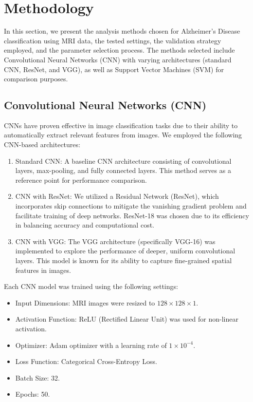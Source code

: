 \documentclass[runningheads]{llncs}
\begin{document}
\section{Methodology}

In this section, we present the analysis methods chosen for Alzheimer's Disease classification using MRI data, the tested settings, the validation strategy employed, and the parameter selection process. The methods selected include Convolutional Neural Networks (CNN) with varying architectures (standard CNN, ResNet, and VGG), as well as Support Vector Machines (SVM) for comparison purposes.

\subsection{Convolutional Neural Networks (CNN)}
CNNs have proven effective in image classification tasks due to their ability to automatically extract relevant features from images. We employed the following CNN-based architectures:

\begin{enumerate}
    \item Standard CNN: A baseline CNN architecture consisting of convolutional layers, max-pooling, and fully connected layers. This method serves as a reference point for performance comparison.
    \item CNN with ResNet: We utilized a Residual Network (ResNet), which incorporates skip connections to mitigate the vanishing gradient problem and facilitate training of deep networks. ResNet-18 was chosen due to its efficiency in balancing accuracy and computational cost.
    \item CNN with VGG: The VGG architecture (specifically VGG-16) was implemented to explore the performance of deeper, uniform convolutional layers. This model is known for its ability to capture fine-grained spatial features in images.
\end{enumerate}

Each CNN model was trained using the following settings:
\begin{itemize}
    \item Input Dimensions: MRI images were resized to $128 \times 128 \times 1$.
    \item Activation Function: ReLU (Rectified Linear Unit) was used for non-linear activation.
    \item Optimizer: Adam optimizer with a learning rate of $1 \times 10^{-4}$.
    \item Loss Function: Categorical Cross-Entropy Loss.
    \item Batch Size: 32.
    \item Epochs: 50.
\end{itemize}
\end{document}
